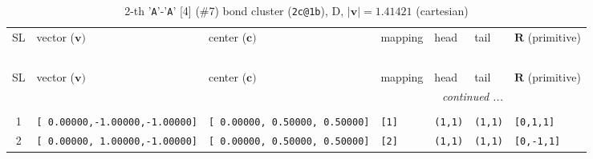 \documentclass[fleqn,10pt,landscape]{jsarticle}
\begin{document}
\renewcommand{\arraystretch}{1.6}
\begin{longtable}[l]{cllllll}
\captionsetup{justification=raggedright, singlelinecheck=off}
\caption{2-th '\texttt{A}'-'\texttt{A}' [4] (\#7) bond cluster (\texttt{2c@1b}), D, $|\bm{v}|=1.41421$ (cartesian)}
 \\
 \hline \hline
SL & vector ($\bm{v})$ & center ($\bm{c})$ & mapping & head & tail & $\bm{R}$ (primitive) \\ \hline \endfirsthead

\multicolumn{6}{l}{\tablename\ \thetable{}} \\
 \hline \hline
SL & vector ($\bm{v})$ & center ($\bm{c})$ & mapping & head & tail & $\bm{R}$ (primitive) \\ \hline \endhead

 \hline \hline
\multicolumn{6}{r}{\footnotesize\it continued ...} \\ \endfoot

 \hline \hline
\multicolumn{6}{r}{} \\ \endlastfoot

1 & \texttt{[ 0.00000,-1.00000,-1.00000]} & \texttt{[ 0.00000, 0.50000, 0.50000]} & \texttt{[1]} & \texttt{(1,1)} & \texttt{(1,1)} & \texttt{[0,1,1]} \\ \hline
2 & \texttt{[ 0.00000, 1.00000,-1.00000]} & \texttt{[ 0.00000, 0.50000, 0.50000]} & \texttt{[2]} & \texttt{(1,1)} & \texttt{(1,1)} & \texttt{[0,-1,1]} \\
\end{longtable}
\end{document}
